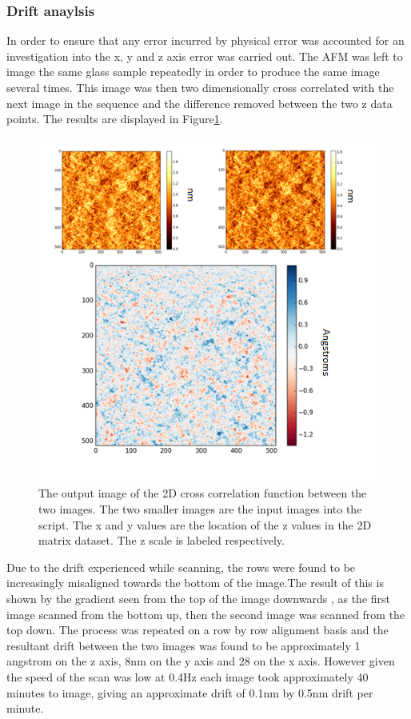 \subsubsection{Drift anaylsis}

In order to ensure that any error incurred by physical error was accounted for an investigation into the x, y and z axis error was carried out. The AFM was left to image the same glass sample repeatedly in order to produce the same image several times. This image was then two dimensionally cross correlated with the next image in the sequence and the difference removed between the two z data points. The results are displayed in Figure\ref{fig:CrossCor}.

\begin{figure}[h]     %
        \begin{center}
          \includegraphics[width=120mm]{chapter3/CrossCor.png}
\end{center}
\caption{The output image of the 2D cross correlation function between the two images. The two smaller images are the input images into the script. The x and y values are the location of the z values in the 2D matrix dataset. The z scale is labeled respectively.}
\label{fig:CrossCor}                 %
\end{figure}

Due to the drift experienced while scanning, the rows were found to be increasingly misaligned towards the bottom of the image.The result of this is shown by the gradient seen from the top of the image downwards , as the first image scanned from the bottom up, then the second image was scanned from the top down. The process was repeated on a row by row alignment basis and the resultant drift between the two images was found to be approximately 1 angstrom on the z axis, 8nm on the y axis and 28 on the x axis. However given the speed of the scan was low at 0.4Hz each image took approximately 40 minutes to image, giving an approximate drift of 0.1nm by 0.5nm drift per minute.

